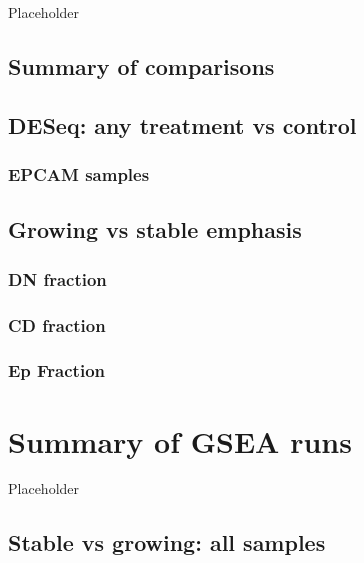\documentclass[
]{book}
\begin{document}
Placeholder

\hypertarget{summary-of-comparisons}{%
\section{Summary of comparisons}\label{summary-of-comparisons}}

\hypertarget{deseq-any-treatment-vs-control}{%
\section{DESeq: any treatment vs control}\label{deseq-any-treatment-vs-control}}

\hypertarget{epcam-samples}{%
\subsection{EPCAM samples}\label{epcam-samples}}

\hypertarget{growing-vs-stable-emphasis}{%
\section{Growing vs stable emphasis}\label{growing-vs-stable-emphasis}}

\hypertarget{dn-fraction}{%
\subsection{DN fraction}\label{dn-fraction}}

\hypertarget{cd-fraction}{%
\subsection{CD fraction}\label{cd-fraction}}

\hypertarget{ep-fraction}{%
\subsection{Ep Fraction}\label{ep-fraction}}

\hypertarget{summary-of-gsea-runs}{%
\chapter{Summary of GSEA runs}\label{summary-of-gsea-runs}}

Placeholder

\hypertarget{stable-vs-growing-all-samples}{%
\section{Stable vs growing: all samples}\label{stable-vs-growing-all-samples}}
\end{document}
